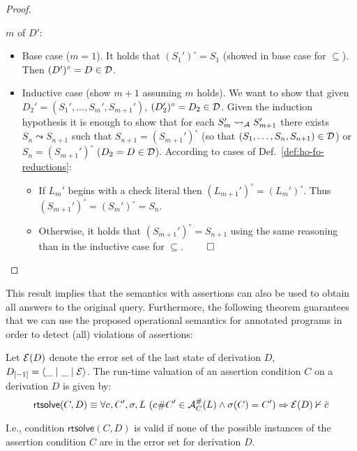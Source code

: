 \documentclass{llncs}
\newcommand{\A}
  {\ensuremath{{\cal A}}}
\newcommand{\AC}
  {\ensuremath{{\cal A}_{C}}}
\newcommand{\LabAClit}[1]
  {\ensuremath{\AC^{\#}(#1)}}
\newcommand{\gd}[0]{\mid}
\newcommand{\exstate}[3]
  {\ensuremath{\langle #1 \gd{} #2 \gd{} #3 \rangle}}
\newcommand{\ADeps}{\ensuremath{{\cal E}}}
\newcommand{\nthstate}[2]{\ensuremath{{#1}_{[#2]}}}
\newcommand{\reduction}[2]
  {\ensuremath{#1 \leadsto #2}}
\newcommand{\reductionA}[2]
  {\ensuremath{#1 \leadsto_{\A} #2}}
\newcommand{\asrId}[1]{\ensuremath{c_{#1}}}
\newcommand{\negAsrId}[1]{\ensuremath{\bar{c}_{#1}}}
\newcommand{\errorErase}[1]
  {\ensuremath{#1^{\circ}}}
\begin{document}
\begin{proof}
\begin{itemize}
    $m$ of $D'$:
    \begin{itemize}
    \item Base case ($m=1$). It holds that $\errorErase{(S_1')}= S_1$
      (showed in base case for $\subseteq$). Then $\errorErase{(D')} =
      D \in {\cal D}$.
    \item Inductive case (show $m+1$ assuming $m$ holds).
We want to show that given $D_2' = (S_1',\ldots,S_m',S_{m+1}')$,
      $\errorErase{(D_2')} = D_2 \in {\cal D}$.
Given the induction hypothesis
it is enough to show that for each $\reductionA{S_m'}{S_{m+1}'}$
      there exists $\reduction{S_n}{S_{n+1}}$ such that $S_{n+1} =
      \errorErase{(S_{m+1}')}$ (so that $(S_1,\ldots,S_n,S_{n+1}) \in
      {\cal D}$) or $S_n = \errorErase{(S_{m+1}')}$ ($D_2 = D \in
      {\cal D}$).
According to cases of Def.~\ref{def:ho-fo-reductions}:
      \begin{itemize}
      \item If $L_m'$ begins with a check literal then
        $\errorErase{(L_{m+1}')} = \errorErase{(L_m')}$. Thus
        $\errorErase{(S_{m+1}')} = \errorErase{(S_m')} = S_n$.
      \item Otherwise, it holds that $\errorErase{(S_{m+1}')}=
        S_{n+1}$ using the same reasoning than in the inductive case
        for $\subseteq$.
\hfill $\qed$
      \end{itemize}
    \end{itemize}
  \end{itemize}
\end{proof}

This result implies that the semantics with assertions can also be
used to obtain all answers to the original query. Furthermore, the
following theorem guarantees that we can use the proposed operational
semantics for annotated programs in order to detect (all) violations
of assertions:

\begin{definition}
  \label{def:rtsolve}
Let $\ADeps(D)$ denote the error set of the last state
  of derivation 
  $D$, $\nthstate{D}{-1}=\exstate{\_}{\_}{\ADeps}$.
The run-time valuation of an assertion condition $C$ on a derivation
  $D$ is given by:
\[
    \textsf{rtsolve}(C,D) \equiv
    \forall \asrId{}, C', \sigma, L ~ (\asrId{}\#C' \in \LabAClit{L}
    \wedge \sigma(C) = C') \Rightarrow \ADeps(D) \nvdash \negAsrId{}
  \]
\end{definition}
I.e., condition $\textsf{rtsolve}(C,D)$ is valid if none of the possible
instances of the assertion condition $C$ are in the error set for
derivation $D$.
\end{document}
